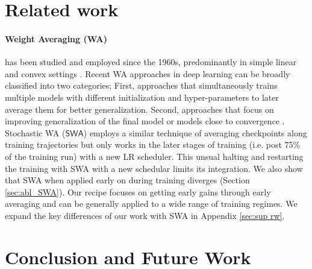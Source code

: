 \documentclass{article}
\begin{document}

\section{Related work} \label{sec:rw}

\paragraph{Weight Averaging (WA)} has been studied and employed since the 1960s, predominantly in simple linear \citep{lakshminarayanan2018linear} and convex settings \citep{polyak_avg,neu2018iterate}. Recent WA approaches in deep learning can be broadly classified into two categories; First, approaches that simultaneously trains multiple models with different initialization and hyper-parameters \citep{model_soups,rame2022diverse, jolicoeur-martineau2023population,ramemodel} to later average them for better generalization. Second, approaches that focus on improving generalization of the final model or models close to convergence \citep{tarvainen2017mean,SWA,athiwaratkun2018improving,yang2019swalp,cha2021swad}. Stochastic WA ($\mathsf{SWA}$) \citep{SWA} employs a similar technique of averaging checkpoints along training trajectories but only works in the later stages of training (i.e. post 75\% of the training run) with a new LR scheduler. This unsual halting and restarting the training with SWA with a new schedular limits its integration. We also show that SWA when applied early on during training diverges (Section \ref{sec:abl_SWA}). Our recipe focuses on getting early gains through early averaging and can be generally applied to a wide range of training regimes. We expand the key differences of our work with SWA in Appendix \ref{sec:sup rw}.

\section{Conclusion and Future Work}
\end{document}
